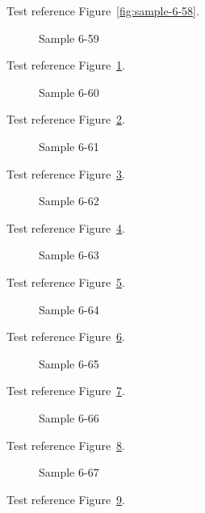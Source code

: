 Test reference Figure~\ref{fig:sample-6-58}.

\begin{figure}[tbhp]
\caption{Sample 6-59}
\label{fig:sample-6-59}
\end{figure}

Test reference Figure~\ref{fig:sample-6-59}.

\begin{figure}[tbhp]
\caption{Sample 6-60}
\label{fig:sample-6-60}
\end{figure}

Test reference Figure~\ref{fig:sample-6-60}.

\begin{figure}[tbhp]
\caption{Sample 6-61}
\label{fig:sample-6-61}
\end{figure}

Test reference Figure~\ref{fig:sample-6-61}.

\begin{figure}[tbhp]
\caption{Sample 6-62}
\label{fig:sample-6-62}
\end{figure}

Test reference Figure~\ref{fig:sample-6-62}.

\begin{figure}[tbhp]
\caption{Sample 6-63}
\label{fig:sample-6-63}
\end{figure}

Test reference Figure~\ref{fig:sample-6-63}.

\begin{figure}[tbhp]
\caption{Sample 6-64}
\label{fig:sample-6-64}
\end{figure}

Test reference Figure~\ref{fig:sample-6-64}.

\begin{figure}[tbhp]
\caption{Sample 6-65}
\label{fig:sample-6-65}
\end{figure}

Test reference Figure~\ref{fig:sample-6-65}.

\begin{figure}[tbhp]
\caption{Sample 6-66}
\label{fig:sample-6-66}
\end{figure}

Test reference Figure~\ref{fig:sample-6-66}.

\begin{figure}[tbhp]
\caption{Sample 6-67}
\label{fig:sample-6-67}
\end{figure}

Test reference Figure~\ref{fig:sample-6-67}.

